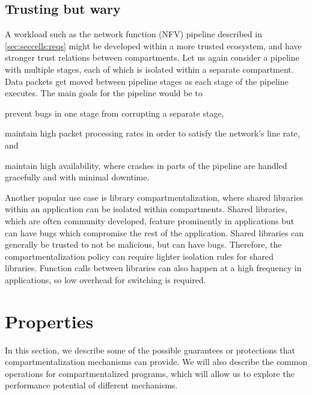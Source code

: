 \subsection{Trusting but wary}
\label{sec:compreview:usecases:wary}
A workload such as the network function (NFV) pipeline described in 
\autoref{sec:seccells:reqs} might be developed within a more trusted
ecosystem, and have stronger trust relations between compartments.
Let us again consider a pipeline with multiple stages, each of which
is isolated within a separate compartment.
Data packets get moved between pipeline stages as each stage of the
pipeline executes.
The main goals for the pipeline would be to 
\begin{inparaenum}
      \item prevent bugs in one stage from corrupting a separate stage, 
      \item maintain high packet processing rates in order to satisfy
            the network's line rate, and
      \item maintain high availability, where crashes in parts of the
            pipeline are handled gracefully and with minimal downtime.  
\end{inparaenum}

Another popular use case is library compartmentalization, where shared
libraries within an application can be isolated within compartments.
Shared libraries, which are often community developed, feature prominently
in applications but can have bugs which compromise the rest of the
application.
Shared libraries can generally be trusted to not be malicious, but can
have bugs. 
Therefore, the compartmentalization policy can require lighter isolation
rules for shared libraries.
Function calls between libraries can also happen at a high frequency in
applications, so low overhead for switching is required.


\section{Properties}
\label{sec:compreview:properties}

In this section, we describe some of the possible guarantees or protections
that compartmentalization mechanisms can provide.
We will also describe the common operations for compartmentalized programs,
which will allow us to explore the performance potential of different
mechanisms.

